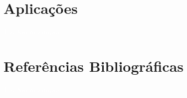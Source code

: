 \documentclass[11pt,fleqn]{book} %
\begin{document}
\chapter{Aplicações}\label{aplicacoes}
\vspace{6em}
\begin{flushright}
	\textit{\textcolor{white}{Um bonita citação...}}
\end{flushright}
\vspace{12em}



%

\chapter*{Referências Bibliográficas}\label{referencias}
\vspace{6em}
\begin{flushright}
	\textit{\textcolor{white}{Um bonita citação...}}
\end{flushright}
\vspace{12em}
\printbibliography[heading=bibempty]


\end{document}
